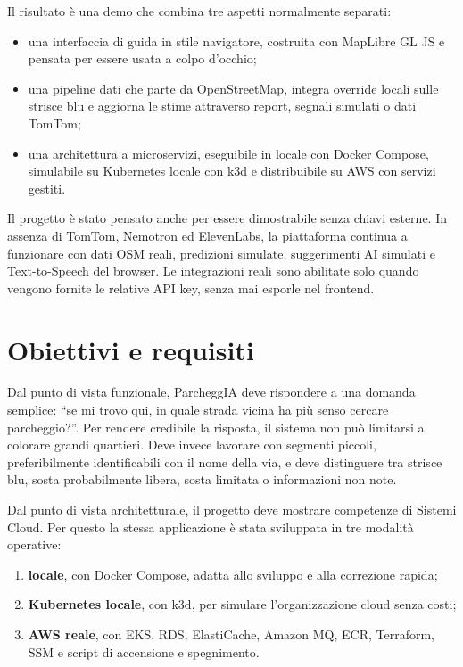 \documentclass[11pt,a4paper]{article}
\begin{document}
Il risultato \`e una demo che combina tre aspetti normalmente separati:

\begin{itemize}
  \item una interfaccia di guida in stile navigatore, costruita con MapLibre GL JS e pensata per essere usata a colpo d'occhio;
  \item una pipeline dati che parte da OpenStreetMap, integra override locali sulle strisce blu e aggiorna le stime attraverso report, segnali simulati o dati TomTom;
  \item una architettura a microservizi, eseguibile in locale con Docker Compose, simulabile su Kubernetes locale con k3d e distribuibile su AWS con servizi gestiti.
\end{itemize}

Il progetto \`e stato pensato anche per essere dimostrabile senza chiavi esterne. In assenza di TomTom, Nemotron ed ElevenLabs, la piattaforma continua a funzionare con dati OSM reali, predizioni simulate, suggerimenti AI simulati e Text-to-Speech del browser. Le integrazioni reali sono abilitate solo quando vengono fornite le relative API key, senza mai esporle nel frontend.

\section{Obiettivi e requisiti}

Dal punto di vista funzionale, ParcheggIA deve rispondere a una domanda semplice: ``se mi trovo qui, in quale strada vicina ha pi\`u senso cercare parcheggio?''. Per rendere credibile la risposta, il sistema non pu\`o limitarsi a colorare grandi quartieri. Deve invece lavorare con segmenti piccoli, preferibilmente identificabili con il nome della via, e deve distinguere tra strisce blu, sosta probabilmente libera, sosta limitata o informazioni non note.

Dal punto di vista architetturale, il progetto deve mostrare competenze di Sistemi Cloud. Per questo la stessa applicazione \`e stata sviluppata in tre modalit\`a operative:

\begin{enumerate}
  \item \textbf{locale}, con Docker Compose, adatta allo sviluppo e alla correzione rapida;
  \item \textbf{Kubernetes locale}, con k3d, per simulare l'organizzazione cloud senza costi;
  \item \textbf{AWS reale}, con EKS, RDS, ElastiCache, Amazon MQ, ECR, Terraform, SSM e script di accensione e spegnimento.
\end{enumerate}
\end{document}
